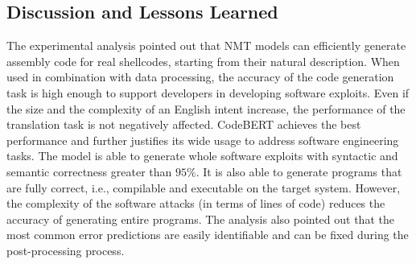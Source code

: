 \subsection{Discussion and Lessons Learned}
\label{subsec:discussion}
The experimental analysis pointed out that NMT models can efficiently generate assembly code for real shellcodes, starting from their natural description. When used in combination with data processing, the accuracy of the code generation task is high enough to support developers in developing software exploits. 
Even if the size and the complexity of an English intent increase, the performance of the translation task is not negatively affected. 
CodeBERT achieves the best performance and further justifies its wide usage to address software engineering tasks. 
The model is able to generate whole software exploits with syntactic and semantic correctness greater than $95\%$. It is also able to generate programs that are fully correct, i.e., compilable and executable on the target system. However, the complexity of the software attacks (in terms of lines of code) reduces the accuracy of generating entire programs.
The analysis also pointed out that the most common error predictions are easily identifiable and can be fixed during the post-processing process. 
